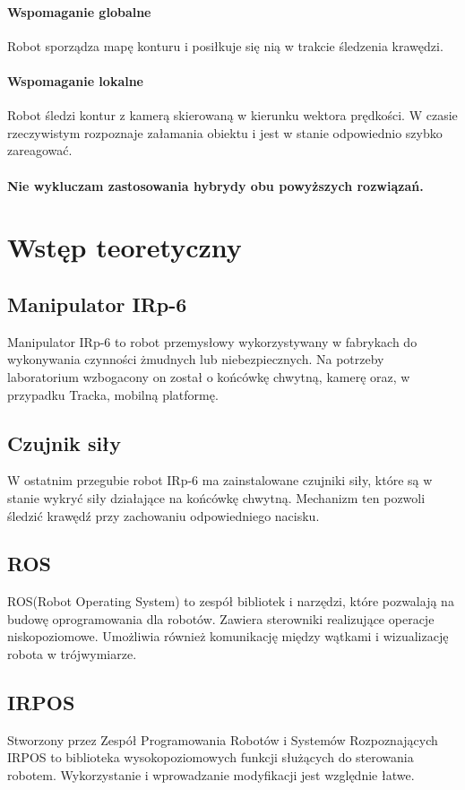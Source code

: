 \documentclass[12pt, a4paper, twoside]{book}
\begin{document}
			\subsubsection{Wspomaganie globalne}
			Robot sporządza mapę konturu i posiłkuje się nią w trakcie śledzenia krawędzi.
			\subsubsection{Wspomaganie lokalne}
			Robot śledzi kontur z kamerą skierowaną w kierunku wektora prędkości. W czasie rzeczywistym rozpoznaje załamania obiektu i jest w stanie odpowiednio szybko zareagować.
			\subsubsection{Nie wykluczam zastosowania hybrydy obu powyższych rozwiązań.}
\chapter{Wstęp teoretyczny}
	\section{Manipulator IRp-6}
	Manipulator IRp-6 to robot przemysłowy wykorzystywany w fabrykach do wykonywania czynności żmudnych lub niebezpiecznych. Na potrzeby laboratorium wzbogacony on został o końcówkę chwytną, kamerę oraz, w przypadku Tracka, mobilną platformę. 
	\section{Czujnik siły}
	W ostatnim przegubie robot IRp-6 ma zainstalowane czujniki siły, które są w stanie wykryć siły działające na końcówkę chwytną. Mechanizm ten pozwoli śledzić krawędź przy zachowaniu odpowiedniego nacisku.
	\section{ROS}
	ROS(Robot Operating System) to zespół bibliotek i narzędzi, które pozwalają na budowę oprogramowania dla robotów. Zawiera sterowniki realizujące operacje niskopoziomowe. Umożliwia również komunikację między wątkami i wizualizację robota w trójwymiarze.
	\section{IRPOS}
	Stworzony przez Zespół Programowania Robotów i Systemów Rozpoznających IRPOS to biblioteka wysokopoziomowych funkcji służących do sterowania robotem. Wykorzystanie i wprowadzanie modyfikacji jest względnie łatwe.
\end{document}
